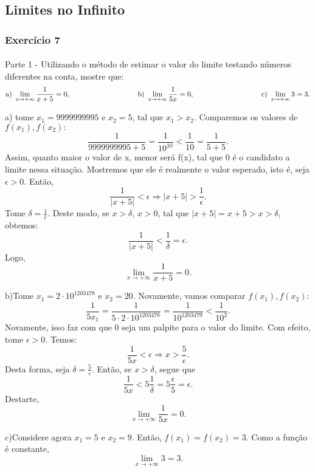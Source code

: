 \documentclass[Calculus1/exercícios_de_cálculo.tex]{subfiles}
\begin{document}
\subsection{Limites no Infinito}
\subsubsection{Exercício 7}
\paragraph{}Parte 1 - Utilizando o método de estimar o valor do limite testando números diferentes na conta, mostre que:
$$
	\text{a) }\lim_{x\to+\infty}\frac{1}{x + 5} = 0,\hspace{3.3cm}
	\text{b) }\lim_{x\to+\infty}\frac{1}{5x} = 0,\hspace{3.3cm}
	\text{c) }\lim_{x\to+\infty}3 = 3.
$$
\begin{sol*}
	a) tome $x_1 = 9999999995$ e $x_2 = 5$, tal que $x_1 > x_2$. Comparemos os valores de $f(x_1), f(x_2):$
	$$
		\frac{1}{9999999995 + 5} =\frac{1}{10^10} < \frac{1}{10} = \frac{1}{5 + 5}.
	$$
	Assim, quanto maior o valor de x, menor será f(x), tal que 0 é o candidato a limite nessa situação. Mostremos que ele é realmente o valor esperado, isto é, seja $\epsilon > 0$. Então,
	$$
		\frac{1}{|x + 5|} < \epsilon \Rightarrow |x + 5| > \frac{1}{\epsilon}.
	$$
	Tome $\delta = \frac{1}{\epsilon}.$ Deste modo, se $x > \delta$, $x > 0$, tal que $|x + 5| = x + 5 > x > \delta$, obtemos:
	$$
		\frac{1}{|x + 5|} < \frac{1}{\delta} = \epsilon.
	$$
	Logo,
	$$
		\lim_{x\to+\infty}\frac{1}{x + 5} = 0.
	$$

	b)Tome $x_1 = 2\cdot{10^{1203478}}$ e $x_2 = 20.$ Novamente, vamos comparar $f(x_1), f(x_2)$:
	$$
		\frac{1}{5x_1} = \frac{1}{5\cdot2\cdot{10^{1203478}}} = \frac{1}{10^{1203479}} < \frac{1}{10^2}.
	$$
	Novamente, isso faz com que 0 seja um palpite para o valor do limite. Com efeito, tome $\epsilon > 0$. Temos:
	$$
		\frac{1}{5x} < \epsilon \Rightarrow x > \frac{5}{\epsilon}.
	$$
	Desta forma, seja $\delta = \frac{5}{\epsilon}.$ Então, se $x > \delta$, segue que
	$$
		\frac{1}{5x} < 5\frac{1}{\delta} = 5\frac{\epsilon}{5} = \epsilon.
	$$
	Destarte,
	$$
		\lim_{x\to+\infty}\frac{1}{5x} = 0.
	$$

	c)Considere agora $x_1 = 5$ e $x_2 = 9$. Então, $f(x_1) = f(x_2) = 3.$ Como a função é constante,
	$$
		\lim_{x\to+\infty}3 = 3.
	$$
	\qedsymbol
\end{sol*}
\end{document}
